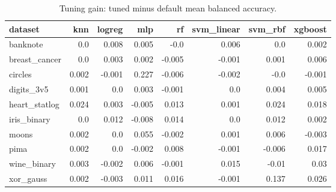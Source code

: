 \begin{table}[ht]
\centering
\caption{Tuning gain: tuned minus default mean balanced accuracy.}
\label{tab:e1-delta-balanced_accuracy}
\begin{tabular}{lrrrrrrr}
\toprule
dataset & knn & logreg & mlp & rf & svm\_linear & svm\_rbf & xgboost \\
\midrule
banknote & 0.0 & 0.008 & 0.005 & -0.0 & 0.006 & 0.0 & 0.002 \\
breast\_cancer & 0.0 & 0.003 & 0.002 & -0.005 & -0.001 & 0.001 & 0.006 \\
circles & 0.002 & -0.001 & 0.227 & -0.006 & -0.002 & -0.0 & -0.001 \\
digits\_3v5 & 0.001 & 0.0 & 0.003 & -0.001 & 0.0 & 0.004 & 0.005 \\
heart\_statlog & 0.024 & 0.003 & -0.005 & 0.013 & 0.001 & 0.024 & 0.018 \\
iris\_binary & 0.0 & 0.012 & -0.008 & 0.014 & 0.0 & 0.012 & 0.002 \\
moons & 0.002 & 0.0 & 0.055 & -0.002 & 0.001 & 0.006 & -0.003 \\
pima & 0.002 & 0.0 & -0.002 & 0.008 & -0.001 & -0.006 & 0.017 \\
wine\_binary & 0.003 & -0.002 & 0.006 & -0.001 & 0.015 & -0.01 & 0.03 \\
xor\_gauss & 0.002 & -0.003 & 0.011 & 0.016 & -0.001 & 0.137 & 0.026 \\
\bottomrule
\end{tabular}
\end{table}
